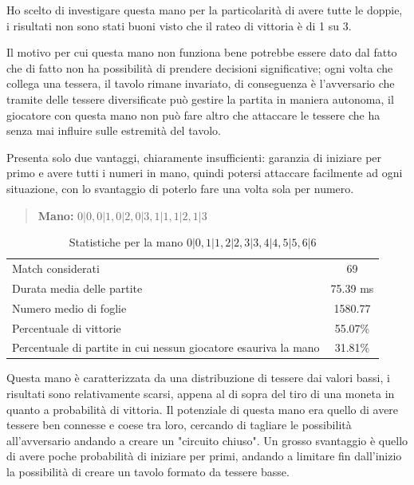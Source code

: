 \documentclass[a4paper,12pt]{report} %
\begin{document}
Ho scelto di investigare questa mano per la particolarità di avere tutte le doppie, i risultati non sono stati buoni visto che il rateo di vittoria è di 1 su 3.

Il motivo per cui questa mano non funziona bene potrebbe essere dato dal fatto che di fatto non ha possibilità di prendere decisioni significative; ogni volta che collega una tessera, il tavolo rimane invariato, di conseguenza è l'avversario che tramite delle tessere diversificate può gestire la partita in maniera autonoma, il giocatore con questa mano non può fare altro che attaccare le tessere che ha senza mai influire sulle estremità del tavolo.

Presenta solo due vantaggi, chiaramente insufficienti: garanzia di iniziare per primo e avere tutti i numeri in mano, quindi potersi attaccare facilmente ad ogni situazione, con lo svantaggio di poterlo fare una volta sola per numero.

\begin{quote}
    \textbf{Mano:} \(0|0, 0|1, 0|2, 0|3, 1|1, 1|2, 1|3\)
\end{quote}

\begin{table}[h!]
    \centering
    \begin{tabular}{|l|c|}
        \hline
        Match considerati & 69 \\
        Durata media delle partite & 75.39 ms \\
        Numero medio di foglie & 1580.77 \\
        Percentuale di vittorie & 55.07\% \\
        Percentuale di partite in cui nessun giocatore esauriva la mano & 31.81\% \\
        \hline
    \end{tabular}
    \caption{Statistiche per la mano \(0|0, 1|1, 2|2, 3|3, 4|4, 5|5, 6|6\)}
    \label{tab:stats_1}
\end{table}

Questa mano è caratterizzata da una distribuzione di tessere dai valori bassi, i risultati sono relativamente scarsi, appena al di sopra del tiro di una moneta in quanto a probabilità di vittoria.
Il potenziale di questa mano era quello di avere tessere ben connesse e coese tra loro, cercando di tagliare le possibilità all'avversario andando a creare un "circuito chiuso".
Un grosso svantaggio è quello di avere poche probabilità di iniziare per primi, andando a limitare fin dall'inizio la possibilità di creare un tavolo formato da tessere basse.
\end{document}
